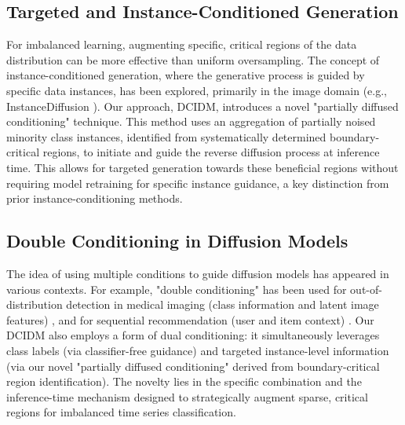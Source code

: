 \documentclass{article}
\begin{document}
\subsection{Targeted and Instance-Conditioned Generation}
For imbalanced learning, augmenting specific, critical regions of the data distribution can be more effective than uniform oversampling. The concept of instance-conditioned generation, where the generative process is guided by specific data instances, has been explored, primarily in the image domain (e.g., InstanceDiffusion \cite{Wang_2023_InstanceDiffusion}).
Our approach, DCIDM, introduces a novel "partially diffused conditioning" technique. This method uses an aggregation of partially noised minority class instances, identified from systematically determined boundary-critical regions, to initiate and guide the reverse diffusion process at inference time. This allows for targeted generation towards these beneficial regions without requiring model retraining for specific instance guidance, a key distinction from prior instance-conditioning methods.

\subsection{Double Conditioning in Diffusion Models}
The idea of using multiple conditions to guide diffusion models has appeared in various contexts. For example, "double conditioning" has been used for out-of-distribution detection in medical imaging (class information and latent image features) \cite{mishra2023dual}, and for sequential recommendation (user and item context) \cite{huang2024dual}.
Our DCIDM also employs a form of dual conditioning: it simultaneously leverages class labels (via classifier-free guidance) and targeted instance-level information (via our novel "partially diffused conditioning" derived from boundary-critical region identification). The novelty lies in the specific combination and the inference-time mechanism designed to strategically augment sparse, critical regions for imbalanced time series classification.
\end{document}
